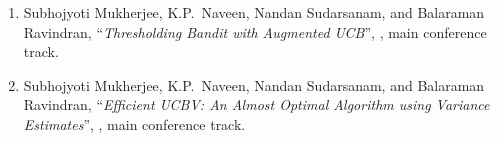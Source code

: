 \documentclass[MS]{iitmdiss}
\begin{document}

\begin{singlespace}


\end{singlespace}



\listofpapers


\begin{enumerate}
\item Subhojyoti Mukherjee, K.P.~Naveen, Nandan Sudarsanam, and Balaraman Ravindran, ``\textit{Thresholding Bandit with Augmented UCB}'', , main conference track.
\item Subhojyoti Mukherjee, K.P.~Naveen, Nandan Sudarsanam, and Balaraman Ravindran, ``\textit{Efficient UCBV: An Almost Optimal Algorithm using Variance Estimates}'', , main conference track.
\end{enumerate}
\end{document}
